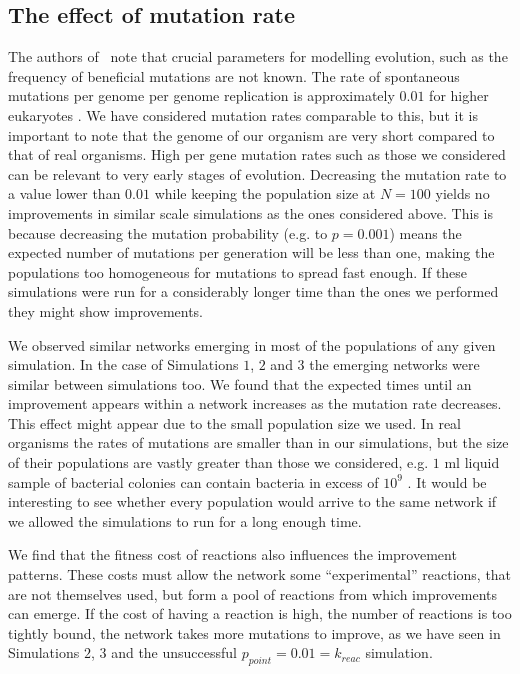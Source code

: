 \documentclass[a4paper,12pt]{article}
\begin{document}
\subsection{The effect of mutation rate}
\label{sub:on_the_effect_of_the_probability_of_mutation}


The authors of \cite{predictability}~note that crucial parameters for modelling evolution, such as the frequency of beneficial mutations are not known. The rate of spontaneous mutations per genome per genome replication is approximately $0.01$ for higher eukaryotes \cite{mutationrate}. We have considered mutation rates comparable to this, but it is important to note that the genome of our organism are very short compared to that of real organisms. High per gene mutation rates such as those we considered can be relevant to very early stages of evolution. Decreasing the mutation rate to a value lower than $0.01$ while keeping the population size at $N=100$ yields no improvements in similar scale simulations as the ones considered above. This is because decreasing the mutation probability (e.g. to $p=0.001$) means the expected number of mutations per generation will be less than one, making the populations too homogeneous for mutations to spread fast enough. If these simulations were run for a considerably longer time than the ones we performed they might show improvements. 

We observed similar networks emerging in most of the populations of any given simulation. In the case of Simulations $1$, $2$ and $3$ the emerging networks were similar between simulations too. We found that the expected times until an improvement appears within a network increases as the mutation rate decreases. This effect might appear due to the small population size we used. In real organisms the rates of mutations are smaller than in our simulations, but the size of their populations are vastly greater than those we considered, e.g. $1$ ml liquid sample of bacterial colonies can contain bacteria in excess of $10^9$ \cite{barteklecture}. It would be interesting to see whether every population would arrive to the same network if we allowed the simulations to run for a long enough time.

We find that the fitness cost of reactions also influences the improvement patterns. These costs must allow the network some ``experimental'' reactions, that are not themselves used, but form a pool of reactions from which improvements can emerge. If the cost of having a reaction is high, the number of reactions is too tightly bound, the network takes more mutations to improve, as we have seen in Simulations $2$, $3$ and the unsuccessful $p_{point}=0.01=k_{reac}$ simulation.
\end{document}
